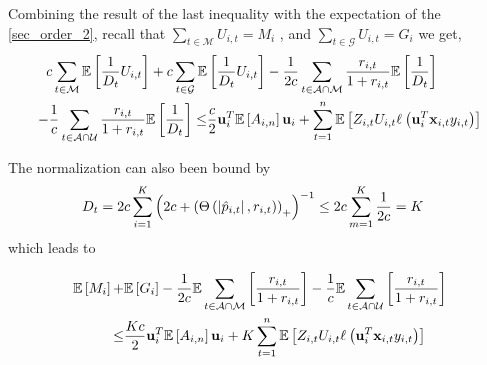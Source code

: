 Combining the result of the last inequality with the expectation of the  \eqref{sec_order_2}, recall that  $\sum_{t\in\mathcal{M}}U_{i,t}=M_i$ , and  $\sum_{t\in\mathcal{G}}U_{i,t}=G_i$ we get,   
\begin{equation*}
\begin{split}
c \sum_{t\in\mathcal{M}}\mathbb{E}\left[{\frac{1}{D_t}U_{i,t}}\right]+c \sum_{t\in\mathcal{G}}\mathbb{E}&\left[{\frac{1}{D_t}U_{i,t}}\right]
-\frac{1}{2c}\sum_{t\in\mathcal{A\cap M}}\frac{r_{i,t}}{1+r_{i,t}}\mathbb{E}\left[{\frac{1}{D_t}}\right]\\
-\frac{1}{c}\sum_{t\in\mathcal{A\cap U}}\frac{r_{i,t}}{1+r_{i,t}}\mathbb{E}\left[{\frac{1}{D_t}}\right]
\le& \frac{c}{2} \mathbf{u}_i^T \mathbb{E}\left[{A_{i,n}}\right] \mathbf{u}_i+\sum_{t=1}^{n}\mathbb{E}\left[{{Z_{i,t}U_{i,t}\ell_{}\left({\mathbf{u}_i^T\mathbf{x}_{i,t}y_{i,t}}\right)}}\right]
\end{split}
\end{equation*}

The normalization can also been bound by
\begin{equation*}
\begin{split}
D_{t}=2c\sum_{i=1}^{K}{\left({2c+\left({\Theta\left({\left\vert{\hat{p}_{i,t}}\right\vert,r_{i,t}}\right)}\right)_+}\right)^{-1}}& \le  2c\sum_{m=1}^{K}{\frac{1}{2c}}=K
\end{split}
\end{equation*}
which leads to


\begin{equation*}
\begin{split}
\mathbb{E}\left[{M_{i}}\right]+ &\mathbb{E}\left[{G_{i}}\right]
-\frac{1}{2c}\mathbb{E}\sum_{t\in\mathcal{A\cap M}}\left[{\frac{r_{i,t}}{1+r_{i,t}}}\right]
-\frac{1}{c}\mathbb{E}\sum_{t\in\mathcal{A\cap U}}\left[{\frac{r_{i,t}}{1+r_{i,t}}}\right]\\
\le& \frac{Kc}{2} \mathbf{u}_i^T \mathbb{E}\left[{A_{i,n}}\right] \mathbf{u}_i+K\sum_{t=1}^{n}\mathbb{E}\left[{{Z_{i,t}U_{i,t}\ell_{}\left({\mathbf{u}_i^T\mathbf{x}_{i,t}y_{i,t}}\right)}}\right]
\end{split}
\end{equation*}



